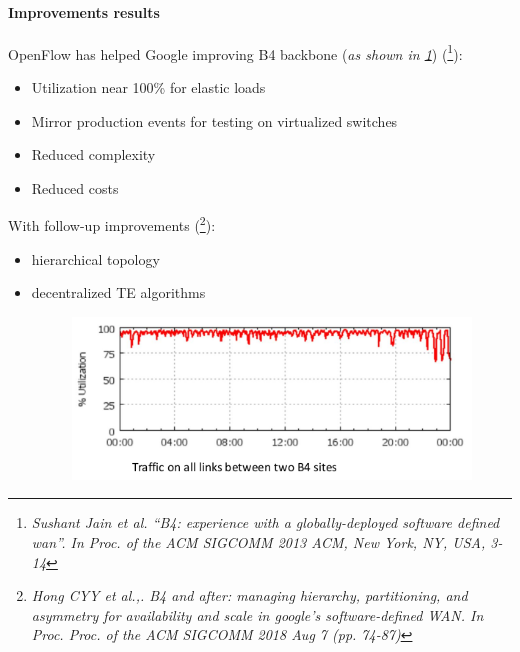 \documentclass[10pt,a4paper]{report}
\theoremstyle{definition}
\begin{document}
\paragraph{Improvements results}\label{sec:improvements-results}
OpenFlow has helped Google improving B4 backbone (\textit{as shown in \ref{b4-performance}}) (\footnote{\textit{Sushant Jain et al. “B4: experience with a globally-deployed software defined wan”. In Proc. of the ACM SIGCOMM 2013 ACM, New York, NY, USA, 3-14}}):
\begin{itemize}
	\item 
	Utilization near 100\% for elastic loads
	\item 
	Mirror production events for testing on virtualized switches
	\item 
	Reduced complexity
	\item 
	Reduced costs
\end{itemize}
	With follow-up improvements (\footnote{\textit{Hong CYY et al.,. B4 and after: managing hierarchy, partitioning, and asymmetry for availability and scale in google's software-defined WAN. In Proc. Proc. of the ACM SIGCOMM 2018 Aug 7 (pp. 74-87)}}):
\begin{itemize}

\item 
	hierarchical topology
	\item 
	decentralized TE algorithms
	\begin{figure}[h!]
		\centering\includegraphics[scale=0.50]{images/Pasted image 20230330105902.png}

	\label{b4-performance}	
\end{figure}
	

\end{itemize}
\end{document}
